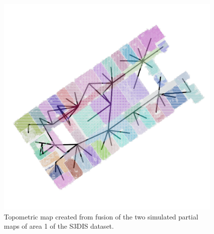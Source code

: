 \begin{figure}[h]
    \centering
    \includegraphics*[width=.8\textwidth]{./fig/area_1_global.jpg}
    \caption{Topometric map created from fusion of the two simulated partial maps of area 1 of the S3DIS dataset.}
    \label{fig:area_1_global}
\end{figure}
